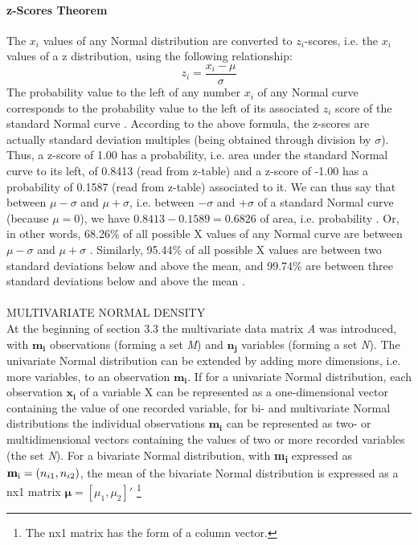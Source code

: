 \documentclass {article}
\begin{document}
\paragraph{z-Scores Theorem}
The $x_i$ values of any Normal distribution are converted to $z_i$-scores, i.e. the $x_i$ values of a z distribution, using the following relationship:
\tab
\begin{equation*}
z_i = \frac{x_i- \mu}{\sigma}
\end{equation*} 
The probability value to the left of any number $x_i$ of any Normal curve corresponds to the probability value to the left of its associated $z_i$ score of the standard Normal curve \cite{lial_calculus_2012}.
According to the above formula, the z-scores are actually standard deviation multiples (being obtained through division by $\sigma$).
 Thus, a z-score of 1.00 has a probability, i.e. area under the standard Normal curve to its left, of 0.8413 (read from z-table) and a z-score of -1.00 has a probability of 0.1587 (read from z-table) associated to it. 
We can thus say that between $\mu - \sigma$ and $\mu + \sigma$, i.e. between $-\sigma$ and $+\sigma$  of a standard Normal curve (because $\mu=0$), we have $0.8413 - 0.1589=0.6826$ of area, i.e. probability \cite{lial_calculus_2012}.
 Or, in other words, 68.26\% of all possible X values of any Normal curve are between $\mu-\sigma$ and $\mu+\sigma$ \cite{moore_basic_2015}.
 Similarly, 95.44\% of all possible X values are between two standard deviations below and above the mean, and 99.74\% are between three standard deviations below and above the mean \cite{moore_basic_2015}.   
\\
\\
MULTIVARIATE NORMAL DENSITY\\
At the beginning of section 3.3 the multivariate data matrix \textit{A} was introduced, with $\mathbf{m_i}$ observations (forming a set \textit{M}) and $\mathbf{n_j}$ variables (forming a set \textit{N}).
The univariate Normal distribution can be extended by adding more dimensions, i.e. more variables, to an observation $\mathbf{m_i}$. 
If for a univariate Normal distribution, each observation $\mathbf{x_i}$ of a variable X can be represented as a one-dimensional vector containing the value of one recorded variable, for bi- and multivariate Normal distributions the individual observations $\mathbf{m_i}$ can be represented as two- or multidimensional vectors containing the values of two or more recorded variables (the set \textit{N}). 
For a bivariate Normal distribution, with \textbf{m\textsubscript{i}} expressed as $\mathbf{m\textsubscript{i}}= (n_{i1}, n_{i2})$, the mean of the bivariate Normal distribution is expressed as a nx1 matrix $\boldsymbol{\mu}=[\mu_1, \mu_2]'$ \footnote{The nx1 matrix has the form of a column vector.}
\end{document}

